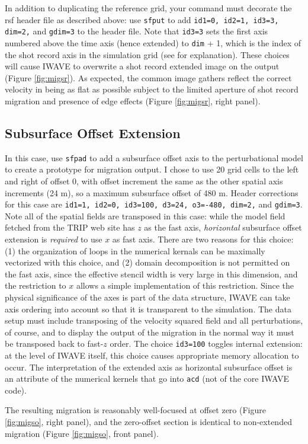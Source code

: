 In addition to duplicating the reference grid, your command must decorate the rsf header file as described above: use {\tt sfput} to add {\tt id1=0, id2=1, id3=3, dim=2,} and {\tt gdim=3} to the header file. Note that {\tt id3=3} sets the first axis numbered above the time axis (hence extended) to {\tt dim} + 1, which is the index of the shot record axis in the simulation grid (see \cite[]{trip14:struct} for explanation). These choices will cause IWAVE to overwrite a shot record extended image on the output (Figure \ref{fig:migsr}). As expected, the common image gathers reflect the correct velocity in being as flat as possible subject to the limited aperture of shot record migration and presence of edge effects (Figure \ref{fig:migsr}, right panel).


\subsection{Subsurface Offset Extension}
In this case, use {\tt sfpad} to add a subsurface offset axis to the perturbational model to create a prototype for migration output. I chose to use 20 grid cells to the left and right of offset 0, with offset increment the same as the other spatial axis increments (24 m), so a maximum subsurface offset of 480 m. Header corrections for this case are {\tt id1=1, id2=0, id3=100, d3=24, o3=-480, dim=2,} and {\tt gdim=3}. Note all of the spatial fields are transposed in this case: while the model field fetched from the TRIP web site has $z$ as the fast axis, {\em horizontal} subsurface offset extension is {\em required} to use $x$ as fast axis. There are two reasons for this choice: (1) the organization of loops in the numerical kernals can be maximally vectorized with this choice, and (2) domain decomposition is not permitted on the fast axis, since the effective stencil width is very large in this dimension, and the restriction to $x$ allows a simple implementation of this restriction. Since the physical significance of the axes is part of the data structure, IWAVE can take axis ordering into account so that it is transparent to the simulation. The data setup must include transposing of the velocity squared field and all perturbations, of course, and to display the output of the migration in the normal way it must be transposed back to fast-$z$ order. The choice {\tt id3=100} toggles internal extension: at the level of IWAVE itself, this choice causes appropriate memory allocation to occur. The interpretation of the extended axis as horizontal subsurface offset is an attribute of the numerical kernels that go into {\tt acd} (not of the core IWAVE code).

The resulting migration is reasonably well-focused at offset zero (Figure \ref{fig:migso}, right panel), and the zero-offset section is identical to non-extended migration (Figure \ref{fig:migso}, front panel).





